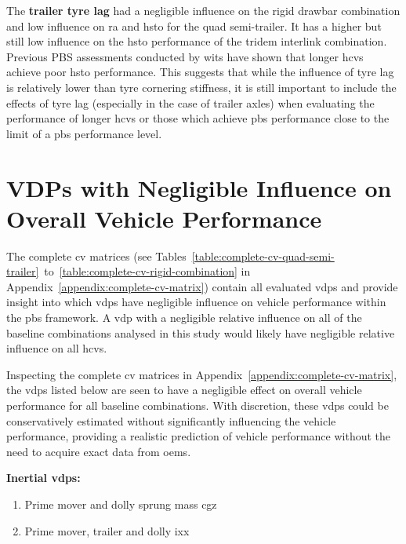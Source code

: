 The \textbf{trailer tyre lag} had a negligible influence on the rigid drawbar combination and low influence on \gls{ra} and \gls{hsto} for the quad semi-trailer. It has a higher but still low influence on the \gls{hsto} performance of the tridem interlink combination. Previous PBS assessments conducted by \gls{wits} have shown that longer \glspl{hcv} achieve poor \gls{hsto} performance. This suggests that while the influence of tyre lag is relatively lower than tyre cornering stiffness, it is still important to include the effects of tyre lag (especially in the case of trailer axles) when evaluating the performance of longer \glspl{hcv} or those which achieve \gls{pbs} performance close to the limit of a \gls{pbs} performance level.

\section{VDPs with Negligible Influence on Overall Vehicle Performance}\label{section:vdps-with-negligible-influence-on-overall-performance}

The complete \gls{cv} matrices (see Tables~\ref{table:complete-cv-quad-semi-trailer}~to~\ref{table:complete-cv-rigid-combination} in Appendix~\ref{appendix:complete-cv-matrix}) contain all evaluated \glspl{vdp} and provide insight into which \glspl{vdp} have negligible influence on vehicle performance within the \gls{pbs} framework. A \gls{vdp} with a negligible relative influence on all of the baseline combinations analysed in this study would likely have negligible relative influence on all \glspl{hcv}. 

Inspecting the complete \gls{cv} matrices in Appendix~\ref{appendix:complete-cv-matrix}, the \glspl{vdp} listed below are seen to have a negligible effect on overall vehicle performance for all baseline combinations. With discretion, these \glspl{vdp} could be conservatively estimated without significantly influencing the vehicle performance, providing a realistic prediction of vehicle performance without the need to acquire exact data from \glspl{oem}.

\textbf{Inertial \glspl{vdp}:}
\begin{enumerate}
	\item Prime mover and dolly sprung mass \gls{cgz}
	\item Prime mover, trailer and dolly \gls{ixx}
\end{enumerate}

